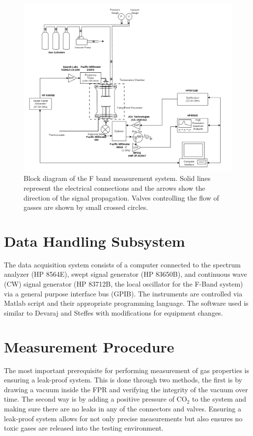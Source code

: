 \begin{figure}[H]
    \centering
	\includegraphics[width=1\textwidth]{./images/f-bandsystem.png}
	\caption{Block diagram of the F band measurement system. Solid lines represent the electrical connections and the arrows show the direction of the signal propagation. Valves controlling the flow of gasses are shown by small crossed circles.  }
    \label{fig:fbandimage}
\end{figure}

\section{Data Handling Subsystem}

The data acquisition system consists of a computer connected to the spectrum analyzer (HP 8564E), swept signal generator (HP 83650B), and continuous wave (CW) signal generator (HP 83712B, the local oscillator for the F-Band system) via a general purpose interface bus (GPIB). The instruments are controlled via Matlab script and their appropriate programming language. The software used is similar to Devaraj and Steffes \cite{Devaraj-2011} \cite{Devaraj-thesis} with modifications for equipment changes.

\section{Measurement Procedure}

The most important prerequisite for performing measurement of gas properties is ensuring a leak-proof system. This is done through two methods, the first is by drawing a vacuum inside the FPR and verifying the integrity of the vacuum over time. The second way is by adding a positive pressure of CO$_2$ to the system and making sure there are no leaks in any of the connectors and valves. Ensuring a leak-proof system allows for not only precise measurements but also ensures no toxic gases are released into the testing environment.

